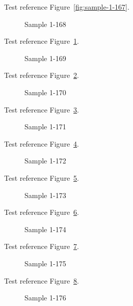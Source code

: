 Test reference Figure~\ref{fig:sample-1-167}.

\begin{figure}[tbhp]
\caption{Sample 1-168}
\label{fig:sample-1-168}
\end{figure}

Test reference Figure~\ref{fig:sample-1-168}.

\begin{figure}[tbhp]
\caption{Sample 1-169}
\label{fig:sample-1-169}
\end{figure}

Test reference Figure~\ref{fig:sample-1-169}.

\begin{figure}[tbhp]
\caption{Sample 1-170}
\label{fig:sample-1-170}
\end{figure}

Test reference Figure~\ref{fig:sample-1-170}.

\begin{figure}[tbhp]
\caption{Sample 1-171}
\label{fig:sample-1-171}
\end{figure}

Test reference Figure~\ref{fig:sample-1-171}.

\begin{figure}[tbhp]
\caption{Sample 1-172}
\label{fig:sample-1-172}
\end{figure}

Test reference Figure~\ref{fig:sample-1-172}.

\begin{figure}[tbhp]
\caption{Sample 1-173}
\label{fig:sample-1-173}
\end{figure}

Test reference Figure~\ref{fig:sample-1-173}.

\begin{figure}[tbhp]
\caption{Sample 1-174}
\label{fig:sample-1-174}
\end{figure}

Test reference Figure~\ref{fig:sample-1-174}.

\begin{figure}[tbhp]
\caption{Sample 1-175}
\label{fig:sample-1-175}
\end{figure}

Test reference Figure~\ref{fig:sample-1-175}.

\begin{figure}[tbhp]
\caption{Sample 1-176}
\label{fig:sample-1-176}
\end{figure}

